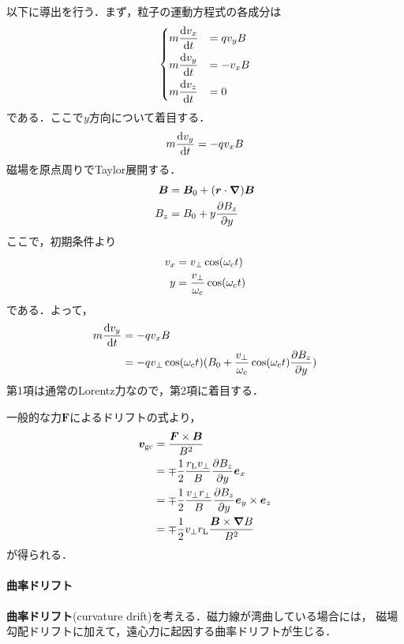 \documentclass{report}
\begin{document}
          以下に導出を行う．まず，粒子の運動方程式の各成分は
          \begin{align}
            \begin{dcases}
              m \dv{v_x}{t} &= qv_yB\\
              m \dv{v_y}{t} &= - v_xB\\
              m \dv{v_z}{t} &= 0
            \end{dcases}
          \end{align}
          である．ここで$y$方向について着目する．
          \begin{align}
            m \dv{v_y}{t} = -q v_x B
          \end{align}
          磁場を原点周りでTaylor展開する．
          \begin{align}
            \bm{B} &= \bm{B}_0 + (\bm{r} \cdot \grad)\bm{B}\\
            B_z &= B_0 + y\pdv{B_z}{y}
          \end{align}
          ここで，初期条件より
          \begin{align}
            v_x &= v_{\perp} \cos(\omega_{\mathrm{c}}t)\\
            y &= \frac{v_{\perp}}{\omega_{\mathrm{c}}}\cos(\omega_{\mathrm{c}}t)
          \end{align}
          である．よって，
          \begin{align}
            m \dv{v_y}{t} &= -qv_x B\\
            &=  -q v_{\perp} \cos(\omega_{\mathrm{c}}t) (B_0 + \frac{v_{\perp}}{\omega_{\mathrm{c}}}\cos(\omega_{\mathrm{c}}t)\pdv{B_z}{y})\\
          \end{align}
          第1項は通常のLorentz力なので，第2項に着目する．

          一般的な力$\bm{F}$によるドリフトの式より，
          \begin{align}
            \bm{v}_{\mathrm{gc}} &= \frac{\bm{F}\times\bm{B}}{B^2}\\
            &= \mp \frac{1}{2} \frac{r_{\mathrm{L}}v_{\perp}}{B} \pdv{B_z}{y}\bm{e}_x\\
            &= \mp \frac{1}{2} \frac{v_{\perp} r_{\perp}}{B} \pdv{B_z}{y}\bm{e}_y \times \bm{e}_z\\
            &= \mp \frac{1}{2} v_{\perp} r_{\mathrm{L}} \frac{\bm{B} \times \grad B}{B^2}
          \end{align}
          が得られる．

        \paragraph{曲率ドリフト}
          \textbf{曲率ドリフト}(curvature drift)を考える．磁力線が湾曲している場合には，
          磁場勾配ドリフトに加えて，遠心力に起因する曲率ドリフトが生じる．
\end{document}
